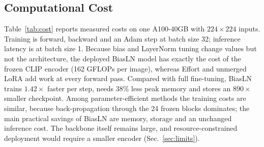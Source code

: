 \documentclass[fonts]{icst}
\begin{document}
\subsection{Computational Cost}
\label{sec:cost}
Table~\ref{tab:cost} reports measured costs on one A100-40GB with $224\times224$ inputs. Training is forward, backward and an Adam step at batch size 32; inference latency is at batch size 1. Because bias and LayerNorm tuning change values but not the architecture, the deployed BiasLN model has exactly the cost of the frozen CLIP encoder (162 GFLOPs per image), whereas Effort and unmerged LoRA add work at every forward pass. Compared with full fine-tuning, BiasLN trains $1.42\times$ faster per step, needs 38\% less peak memory and stores an $890\times$ smaller checkpoint. Among parameter-efficient methods the training costs are similar, because back-propagation through the 24 frozen blocks dominates; the main practical savings of BiasLN are memory, storage and an unchanged inference cost. The backbone itself remains large, and resource-constrained deployment would require a smaller encoder (Sec.~\ref{sec:limits}).

\begin{table}[t]
\centering
\captionsetup{labelsep=period, labelfont=bf, hypcap=false}
\caption{Measured cost on an NVIDIA A100-40GB (fp32, $224\times224$). Train: batch 32, forward + backward + Adam step. Infer: batch 1. Ckpt: size of the stored trainable tensors.}
\label{tab:cost}
\end{table}
\end{document}
